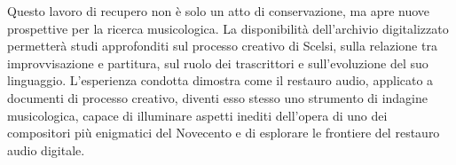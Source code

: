 Questo lavoro di recupero non è solo un atto di conservazione, ma apre nuove prospettive per la ricerca musicologica. La disponibilità dell'archivio digitalizzato permetterà studi approfonditi sul processo creativo di Scelsi, sulla relazione tra improvvisazione e partitura, sul ruolo dei trascrittori e sull'evoluzione del suo linguaggio. L'esperienza condotta dimostra come il restauro audio, applicato a documenti di processo creativo, diventi esso stesso uno strumento di indagine musicologica, capace di illuminare aspetti inediti dell'opera di uno dei compositori più enigmatici del Novecento e di esplorare le frontiere del restauro audio digitale.